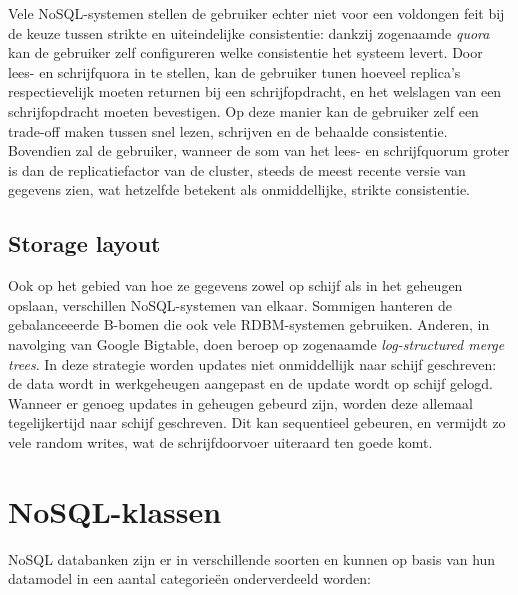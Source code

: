 Vele NoSQL-systemen stellen de gebruiker echter niet voor een voldongen feit bij de keuze tussen strikte en uiteindelijke consistentie: dankzij zogenaamde \textit{quora} kan de gebruiker zelf configureren welke consistentie het systeem levert. Door lees- en schrijfquora in te stellen, kan de gebruiker tunen hoeveel replica's respectievelijk moeten returnen bij een schrijfopdracht, en het welslagen van een schrijfopdracht moeten bevestigen. Op deze manier kan de gebruiker zelf een trade-off maken tussen snel lezen, schrijven en de behaalde consistentie. Bovendien zal de gebruiker, wanneer de som van het lees- en schrijfquorum groter is dan de replicatiefactor van de cluster, steeds de meest recente versie van gegevens zien, wat hetzelfde betekent als onmiddellijke, strikte consistentie.

\subsection{Storage layout}
\label{storage_layout}
Ook op het gebied van hoe ze gegevens zowel op schijf als in het geheugen opslaan, verschillen NoSQL-systemen van elkaar. Sommigen hanteren de gebalanceeerde B-bomen die ook vele RDBM-systemen gebruiken. Anderen, in navolging van Google Bigtable, doen beroep op zogenaamde \textit{log-structured merge trees}. In deze strategie worden updates niet onmiddellijk naar schijf geschreven: de data wordt in werkgeheugen aangepast en de update wordt op schijf gelogd. Wanneer er genoeg updates in geheugen gebeurd zijn, worden deze allemaal tegelijkertijd naar schijf geschreven. Dit kan sequentieel gebeuren, en vermijdt zo vele random writes, wat de schrijfdoorvoer uiteraard ten goede komt. 


\section{NoSQL-klassen}

NoSQL databanken zijn er in verschillende soorten en kunnen op basis van hun datamodel in een aantal categorie\"en onderverdeeld worden:

